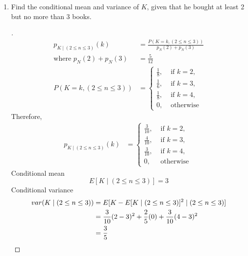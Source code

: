 \documentclass[paper=usletter, fontsize=12pt]{article}
\begin{document}
\begin{enumerate}[label=\textbf{\arabic*}.]
\begin{enumerate}[label=(\alph*)]
            \item Find the conditional mean and variance of $K$, given that he
            bought at least 2 but no more than 3 books.
            \begin{proof}[\unskip\nopunct]
                \begingroup
                \addtolength{\jot}{1em}
                \begin{align*}
                    p_{K \mid (2 \le n \le 3)}(k) & = \frac{P(K=k,(2 \le n \le 3))}{p_N(2) + p_N(3)} \\
                    \text{where } p_N(2) + p_N(3) & = \frac{5}{12} \\
                    P(K=k,(2 \le n \le 3)) & = \begin{cases}
                        \frac{1}{8}, & \text{ if } k = 2, \\
                        \frac{1}{6}, & \text{ if } k = 3, \\
                        \frac{1}{8}, & \text{ if } k = 4, \\
                        0, & \text{ otherwise }
                    \end{cases}
                \end{align*}
                \endgroup
                Therefore,
                \begingroup
                \addtolength{\jot}{1em}
                \begin{align*}
                    p_{K \mid (2 \le n \le 3)}(k) & = \begin{cases}
                        \frac{3}{10}, & \text{ if } k = 2, \\
                        \frac{4}{10}, & \text{ if } k = 3, \\
                        \frac{3}{10}, & \text{ if } k = 4, \\
                        0, & \text{ otherwise }
                    \end{cases}
                \end{align*}
                \endgroup
                Conditional mean
                \begin{equation*}
                    E[K \mid (2 \le n \le 3)]=3
                \end{equation*}
                Conditional variance
                \begingroup
                \addtolength{\jot}{1em}
                \begin{align*}
                    var(K \mid (2 \le n \le 3)) & = E[K-E[K \mid (2 \le n \le 3)]^2 \mid (2 \le n \le 3)] \\
                    & = \frac{3}{10}(2-3)^2 + \frac{2}{5}(0) + \frac{3}{10}(4-3)^2 \\
                    & = \frac{3}{5} \qedhere
                \end{align*}
                \endgroup
            \end{proof}
            \vspace{0.2in}


\end{enumerate}
\end{enumerate}
\end{document}
